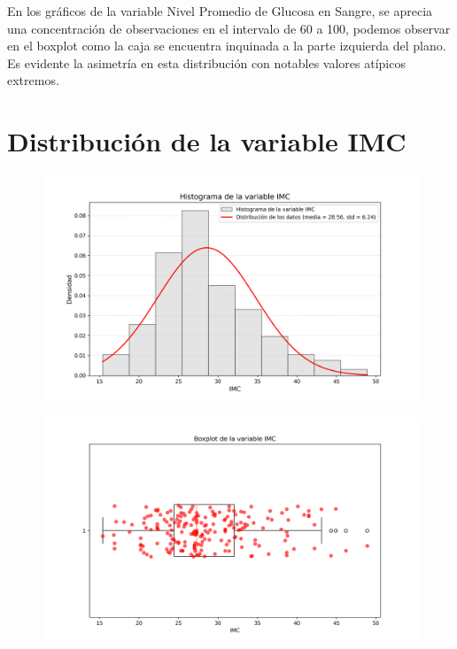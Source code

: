 \documentclass[a4paper, 12pt]{article}
\begin{document}
En los gráficos de la variable Nivel Promedio de Glucosa en Sangre, se aprecia una concentración de observaciones en el intervalo de 60 a 100, podemos observar en el boxplot como la caja se encuentra inquinada a la parte izquierda del plano.
Es evidente la asimetría en esta distribución con notables valores atípicos extremos.



\section{Distribución de la variable IMC}

\begin{figure}[H]
    \centering
    \includegraphics[width=1\textwidth]{img/Histogramas/Histograma_IMC.png}
\end{figure}

\begin{figure}[H]
    \centering
    \includegraphics[width=1\textwidth]{img/Boxplot/Boxplt_IMC.png}
\end{figure}
\end{document}
